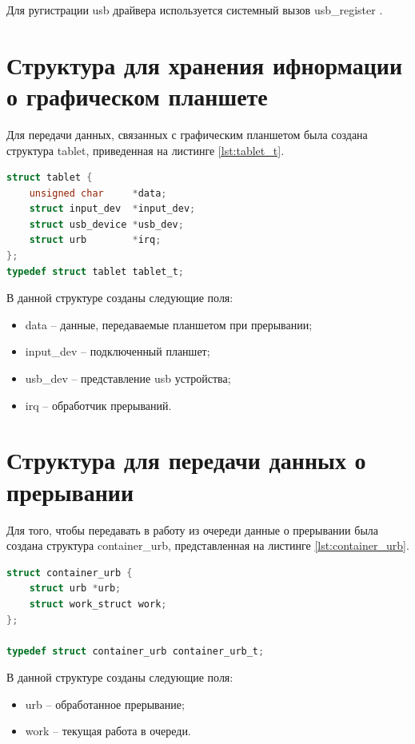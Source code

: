 Для ругистрации usb драйвера используется системный вызов usb\_register \cite{Usb_register}.

\section{Структура для хранения ифнормации о графическом планшете}

Для передачи данных, связанных с графическим планшетом была создана структура tablet, приведенная на листинге \ref{lst:tablet_t}.

\begin{lstlisting}[language=c,caption=Структура планшета,label=lst:tablet_t]
struct tablet {
    unsigned char     *data;
    struct input_dev  *input_dev;
    struct usb_device *usb_dev;
    struct urb        *irq;
};
typedef struct tablet tablet_t;
\end{lstlisting}

В данной структуре созданы следующие поля:

\begin{itemize}
    \item data -- данные, передаваемые планшетом при прерывании;
    \item input\_dev -- подключенный планшет;
    \item usb\_dev -- представление usb устройства;
    \item irq -- обработчик прерываний.
\end{itemize}

\section{Структура для передачи данных о прерывании}

Для того, чтобы передавать в работу из очереди данные о прерывании была создана структура container\_urb, представленная на листинге \ref{lst:container_urb}.

\begin{lstlisting}[language=c,caption=Структура для передачи данных о прерывании,label=lst:container_urb]
struct container_urb {
    struct urb *urb;
    struct work_struct work;
};

typedef struct container_urb container_urb_t;
\end{lstlisting}

В данной структуре созданы следующие поля:

\begin{itemize}
    \item urb -- обработанное прерывание;
    \item work -- текущая работа в очереди.
\end{itemize}

